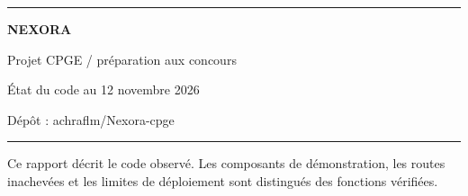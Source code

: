 \documentclass[11pt,oneside]{report}
\begin{document}
\hypersetup{pageanchor=false}
\begin{titlepage}
\color{nexora}\rule{\textwidth}{3pt}\vspace{2cm}
{\Huge\bfseries NEXORA\par}\vspace{0.5cm}{\Large CNC Platform\par}
\vspace{1.5cm}{\huge Documentation technique\par et pédagogique\par}
\vspace{1cm}{\large Architecture, données, sécurité\par et guide de développement\par}
\vfill\color{black}Projet CPGE / préparation aux concours\par
État du code au 12 novembre 2026\par Dépôt : achraflm/Nexora-cpge\par
\vspace{1cm}\rule{\textwidth}{0.5pt}
\small Ce rapport décrit le code observé. Les composants de démonstration, les routes inachevées et les limites de déploiement sont distingués des fonctions vérifiées.
\end{titlepage}
\hypersetup{pageanchor=true}
\tableofcontents\listoffigures\listoftables
\clearpage{}








\nocite{*}
\end{document}
